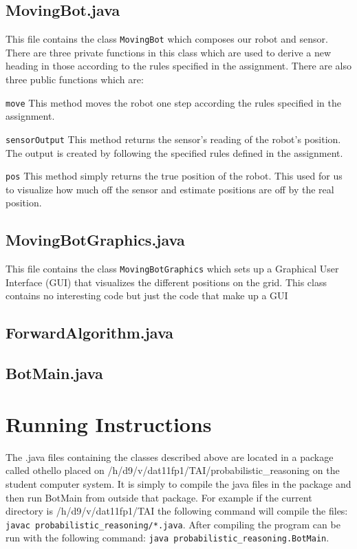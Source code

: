 \documentclass[a4paper]{article}
\begin{document}
\subsection{MovingBot.java}
This file contains the class \texttt{MovingBot} which composes our robot and sensor. There are three private functions in this class which are used to derive a new heading in those according to the rules specified in the assignment. There are also three public functions which are:
\begin{description}
\item{\texttt{move}} This method moves the robot one step according the rules specified in the assignment.
\item{\texttt{sensorOutput}} This method returns the sensor's reading of the robot's position. The output is created by following the specified rules defined in the assignment.
\item{\texttt{pos}} This method simply returns the true position of the robot. This used for us to visualize how much off the sensor and estimate positions are off by the real position.
\end{description}

\subsection{MovingBotGraphics.java}
This file contains the class \texttt{MovingBotGraphics} which sets up a Graphical User Interface (GUI) that visualizes the different positions on the grid. This class contains no interesting code but just the code that make up a GUI
\subsection{ForwardAlgorithm.java}
\subsection{BotMain.java}

\section{Running Instructions} The .java files containing the classes described
above are located in a package called othello placed on
/h/d9/v/dat11fp1/TAI/probabilistic\_reasoning on the student computer system. It
is simply to compile the java files in the package and then run BotMain from
outside that package. For example if the current directory is
/h/d9/v/dat11fp1/TAI the following command will compile the files: \texttt{javac
probabilistic\_reasoning/*.java}. After compiling the program can be run with
the following command: \texttt{java probabilistic\_reasoning.BotMain}.

\end{document}
